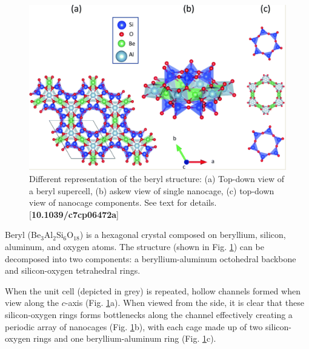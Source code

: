         \begin{figure}
            \centering
            \includegraphics[width=0.9\linewidth]{Figures/System/beryl_structure.png}
            \caption{Different representation of the beryl structure: (a) Top-down view of a beryl supercell, (b) askew view of single nanocage, (c) top-down view of nanocage components. See text for details. [\textbf{10.1039/c7cp06472a}]}
            \label{fig:beryl_structure}
        \end{figure}
        
        Beryl (Be$_3$Al$_2$Si$_6$O$_{18}$) is a hexagonal crystal composed on beryllium, silicon, aluminum, and oxygen atoms. The structure (shown in Fig. \ref{fig:beryl_structure}) can be decomposed into two components: a beryllium-aluminum octohedral backbone and silicon-oxygen tetrahedral rings. 
        
        When the unit cell (depicted in grey) is repeated, hollow channels formed when view along the $c$-axis (Fig. \ref{fig:beryl_structure}a). When viewed from the side, it is clear that these silicon-oxygen rings forms bottlenecks along the channel effectively creating a periodic array of nanocages (Fig. \ref{fig:beryl_structure}b), with each cage made up of two silicon-oxygen rings and one beryllium-aluminum ring (Fig. \ref{fig:beryl_structure}c).
        
